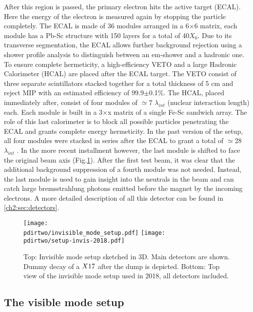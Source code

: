 After this region is passed, the primary electron hits the active target (ECAL). Here the energy of the electron is measured again by stopping the particle completely. The ECAL is made of 36 modules arranged in a 6$\times$6 matrix, each module has a Pb-Sc structure with 150 layers for a total of 40$X_0$. Due to its transverse segmentation, the ECAL allows further background rejection using a shower profile analysis to distinguish between an em-shower and a hadronic one. To ensure complete hermeticity, a high-efficiency VETO and a large Hadronic Calorimeter (HCAL) are placed after the ECAL target. The VETO consist of three separate scintillators stacked together for a total thickness of 5 \si{\centi\meter} and reject MIP with an estimated efficiency of 99.9$\pm$0.1\%. The HCAL, placed immediately after, consist of four modules of $\simeq$7 $\lambda_{int}$ (nuclear interaction length) each. Each module is built in a 3$\times$x matrix of a single Fe-Sc sandwich array. The role of this last calorimeter is to block all possible particles penetrating the ECAL and grants complete energy hermeticity. In the past version of the setup, all four modules were stacked in series after the ECAL to grant a total of $\simeq$28 $\lambda_{int}$ \cite{Banerjee:2016tad}. In the more recent installment however, the last module is shifted to face the original beam axis (Fig.\ref{fig:setup-invis-2018}). After the first test beam, it was clear that the additional background suppression of a fourth module was not needed. Instead, the last module is used to gain insight into the neutrals in the beam and can catch large bremsstrahlung photons emitted before the magnet by the incoming electrons. A more detailed description of all this detector can be found in \ref{ch2:sec:detectors}.

\begin{figure}[tbh!]
  \centering
  \texttt{[image: \\pdirtwo/invisible\_mode\_setup.pdf]}
\texttt{[image: \\pdirtwo/setup-invis-2018.pdf]}
\caption[invisible mode setup 2018]{Top: Invisible mode setup sketched in 3D. Main detectors are shown. Dummy decay of a $X17$ after the dump is depicted. Bottom: Top view of the invisible mode setup used in 2018, all detectors included.}
\label{fig:setup-invis-2018}
\end{figure}

\subsection{The visible mode setup}
\label{ch2:sec:vismode}

